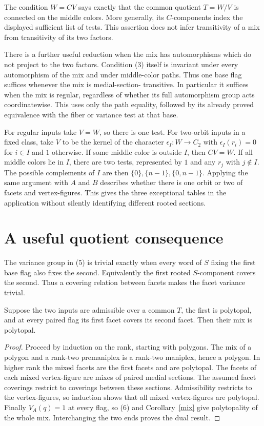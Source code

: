 \documentclass[a4paper,11pt]{article}
\begin{document}
The condition $W=CV$ says exactly that the common quotient $T=W/V$
is connected on the middle colors. More generally, its $C$-components
index the displayed sufficient list of tests. This assertion does not
infer transitivity of a mix from transitivity of its two factors.

There is a further useful reduction when the mix has automorphisms
which do not project to the two factors. Condition (3) itself is
invariant under every automorphism of the mix and under middle-color
paths. Thus one base flag suffices whenever the mix is medial-section-
transitive. In particular it suffices when the mix is regular, regardless
of whether its full automorphism group acts coordinatewise. This uses
only the path equality, followed by its already proved equivalence
with the fiber or variance test at that base.

For regular inputs take $V=W$, so there is one test. For two-orbit
inputs in a fixed class, take $V$ to be the kernel of the character
$\epsilon_I:W\to C_2$ with $\epsilon_I(r_i)=0$ for $i\in I$ and
$1$ otherwise. If some middle color is outside $I$, then $CV=W$.
If all middle colors lie in $I$, there are two tests, represented by
$1$ and any $r_j$ with $j\notin I$. The possible complements of $I$
are then $\{0\},\{n-1\},\{0,n-1\}$. Applying the same argument
with $A$ and $B$ describes whether there is one orbit or two of facets
and vertex-figures. This gives the three exceptional tables in the
application without silently identifying different rooted sections.

\section{A useful quotient consequence}
The variance group in (5) is trivial exactly when every word of $S$
fixing the first base flag also fixes the second. Equivalently the
first rooted $S$-component covers the second. Thus a covering relation
between facets makes the facet variance trivial.

\begin{proposition}\label{facetcover}
Suppose the two inputs are admissible over a common $T$, the first is
polytopal, and at every paired flag its first facet covers its second
facet. Then their mix is polytopal.
\end{proposition}
\begin{proof}
Proceed by induction on the rank, starting with polygons. The mix of
a polygon and a rank-two premaniplex is a rank-two maniplex, hence a
polygon. In higher rank the mixed facets are the first facets and are
polytopal. The facets of each mixed vertex-figure are mixes of paired
medial sections. The assumed facet coverings restrict to coverings
between these sections. Admissibility restricts to the vertex-figures,
so induction shows that all mixed vertex-figures are polytopal.
Finally $V_A(q)=1$ at every flag, so (6) and Corollary~\ref{mix} give
polytopality of the whole mix. Interchanging the two ends proves the
dual result.
\end{proof}
\end{document}
